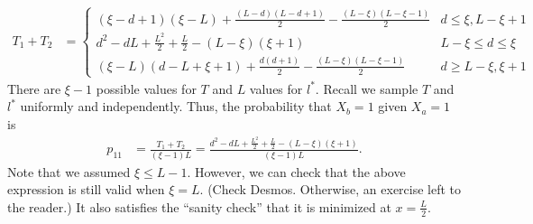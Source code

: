 \documentclass{article}
\begin{document}
\begin{align*}
  T_1 + T_2
  &= 
  \begin{cases}
    (\xi - d + 1) (\xi - L) + \frac{(L-d)(L-d+1)}{2} - \frac{(L-\xi)(L-\xi-1)}{2} & d \leq \xi, L - \xi + 1 \\
    d^2 - dL + \frac{L^2}{2} + \frac{L}{2} - (L-\xi) (\xi+1) & L - \xi \leq d \leq \xi \\
    (\xi - L) (d - L + \xi + 1) + \frac{d(d+1)}{2} - \frac{(L-\xi)(L-\xi-1)}{2} & d \geq L - \xi, \xi + 1
  \end{cases}
\end{align*}
There are $\xi - 1$ possible values for $T$ and $L$ values for $l^*$.
Recall we sample $T$ and $l^*$ uniformly and independently.
Thus, the probability that $X_b = 1$ given $X_a = 1$ is
\begin{align}
  p_{11}
  &= \frac{T_1 + T_2}{(\xi - 1) L}
  = \frac{ d^2 - dL + \frac{L^2}{2} + \frac{L}{2} - (L-\xi) (\xi+1) }{ (\xi - 1) L }.
\end{align}
Note that we assumed $\xi \leq L-1$.
However, we can check that the above expression is still valid when $\xi = L$.
(Check Desmos. 
Otherwise, an exercise left to the reader.)
It also satisfies the ``sanity check'' that it is minimized at $x = \frac{L}{2}$.
\end{document}
